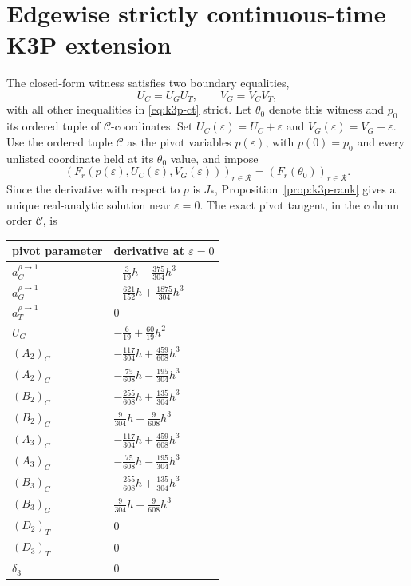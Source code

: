 \documentclass[11pt]{article}
\theoremstyle{remark}\newtheorem{remark}[theorem]{Remark}
\begin{document}
\section{Edgewise strictly continuous-time K3P extension}\label{sec:k3p-ct}
The closed-form witness satisfies two boundary equalities,
\[
U_C=U_GU_T,\qquad V_G=V_CV_T,
\]
with all other inequalities in \eqref{eq:k3p-ct} strict. Let $\theta_0$ denote this witness and $p_0$ its ordered tuple of $\mathcal C$-coordinates. Set $U_C(\varepsilon)=U_C+\varepsilon$ and $V_G(\varepsilon)=V_G+\varepsilon$. Use the ordered tuple $\mathcal C$ as the pivot variables $p(\varepsilon)$, with $p(0)=p_0$ and every unlisted coordinate held at its $\theta_0$ value, and impose
\[
(F_r(p(\varepsilon),U_C(\varepsilon),V_G(\varepsilon)))_{r\in\mathcal R}
=(F_r(\theta_0))_{r\in\mathcal R}.
\]
Since the derivative with respect to $p$ is $J_*$, Proposition~\ref{prop:k3p-rank} gives a unique real-analytic solution near $\varepsilon=0$. The exact pivot tangent, in the column order $\mathcal C$, is
\begin{center}
\small
\renewcommand{\arraystretch}{1.2}
\begin{tabular}{@{}ll@{}}
\toprule
pivot parameter & derivative at $\varepsilon=0$\\
\midrule
$a_C^{\rho\to1}$ & $-\frac3{19}h-\frac{375}{304}h^3$\\
$a_G^{\rho\to1}$ & $-\frac{621}{152}h+\frac{1875}{304}h^3$\\
$a_T^{\rho\to1}$ & $0$\\
$U_G$ & $-\frac6{19}+\frac{60}{19}h^2$\\
$(A_2)_C$ & $-\frac{117}{304}h+\frac{459}{608}h^3$\\
$(A_2)_G$ & $-\frac{75}{608}h-\frac{195}{304}h^3$\\
$(B_2)_C$ & $-\frac{255}{608}h+\frac{135}{304}h^3$\\
$(B_2)_G$ & $\frac9{304}h-\frac9{608}h^3$\\
$(A_3)_C$ & $-\frac{117}{304}h+\frac{459}{608}h^3$\\
$(A_3)_G$ & $-\frac{75}{608}h-\frac{195}{304}h^3$\\
$(B_3)_C$ & $-\frac{255}{608}h+\frac{135}{304}h^3$\\
$(B_3)_G$ & $\frac9{304}h-\frac9{608}h^3$\\
$(D_2)_T$ & $0$\\
$(D_3)_T$ & $0$\\
$\delta_3$ & $0$\\
\bottomrule
\end{tabular}
\end{center}
\end{document}
